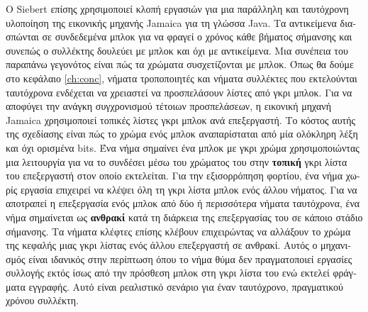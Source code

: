 \begin{greek}
Ο Siebert \cite{DBLP:conf/iwmm/Siebert10} επίσης χρησιμοποιεί
κλοπή εργασιών για μια παράλληλη και ταυτόχρονη υλοποίηση της
εικονικής μηχανής Jamaica για τη γλώσσα Java. Τα αντικείμενα
διασπώνται σε συνδεδεμένα μπλοκ για να φραγεί ο χρόνος κάθε
βήματος σήμανσης και συνεπώς ο συλλέκτης δουλεύει με μπλοκ και
όχι με αντικείμενα. Μια συνέπεια του παραπάνω γεγονότος είναι
πώς τα χρώματα συσχετίζονται με μπλοκ. Όπως θα δούμε στο κεφάλαιο
\ref{ch:conc}, νήματα τροποποιητές και νήματα συλλέκτες
που εκτελούνται ταυτόχρονα ενδέχεται να χρειαστεί να προσπελάσουν
λίστες από γκρι μπλοκ. Για να αποφύγει την ανάγκη συγχρονισμού
τέτοιων προσπελάσεων, η εικονική μηχανή Jamaica χρησιμοποιεί
τοπικές λίστες γκρι μπλοκ ανά επεξεργαστή. Το κόστος αυτής της
σχεδίασης είναι πώς το χρώμα ενός μπλοκ αναπαρίσταται από μία
ολόκληρη λέξη και όχι ορισμένα bits. Ένα νήμα σημαίνει ένα
μπλοκ με γκρι χρώμα χρησιμοποιώντας μια λειτουργία \textenglish{}
για να το συνδέσει μέσω του χρώματος του στην \textbf{τοπική}
γκρι λίστα του επεξεργαστή στον οποίο εκτελείται. Για την
εξισορρόπηση φορτίου, ένα νήμα χωρίς εργασία επιχειρεί να
κλέψει όλη τη γκρι λίστα μπλοκ ενός άλλου νήματος. Για να
αποτραπεί η επεξεργασία ενός μπλοκ από δύο ή περισσότερα νήματα
ταυτόχρονα, ένα νήμα σημαίνεται ως \textbf{ανθρακί} κατά τη
διάρκεια της επεξεργασίας του σε κάποιο στάδιο σήμανσης. Τα
νήματα κλέφτες επίσης κλέβουν επιχειρώντας να αλλάξουν το χρώμα
της κεφαλής μιας γκρι λίστας ενός άλλου επεξεργαστή σε ανθρακί.
Αυτός ο μηχανισμός είναι ιδανικός στην περίπτωση όπου το νήμα
θύμα δεν πραγματοποιεί εργασίες συλλογής εκτός ίσως από την
πρόσθεση μπλοκ στη γκρι λίστα του ενώ εκτελεί φράγματα εγγραφής.
Αυτό είναι ρεαλιστικό σενάριο για έναν ταυτόχρονο, πραγματικού
χρόνου συλλέκτη.


\end{greek}
